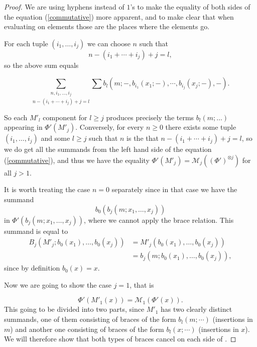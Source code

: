 \documentclass[Thesis.tex]{subfiles}
\begin{document}
\begin{proof}
We are using hyphens instead of $1$'s to make the equality of both sides of the equation (\ref{commutative}) more apparent, and to make clear that when evaluating on elements those are the places where the elements go. %

For each tuple $(i_1,\dots, i_j)$ we can choose $n$ such that \[n-(i_1+\cdots+i_j)+j=l,\] so the above sum equals

\[\underset{n-(i_1+\cdots+i_j)+j=l}{\sum_{n,i_1,\dots, i_j}}\sum b_l(m;-,b_{i_1}(x_1;-),\cdots,b_{i_j}(x_j;-),-).\]

So each $M'_l$ component for $l\geq j$ produces precisely the terms $b_l(m;\dots)$ appearing in $\Phi'(M'_j)$. Conversely, for every $n\geq 0$ there exists some tuple $(i_1,\dots, i_j)$ and some $l\geq j$ such that $n$ is the that $n-(i_1+\cdots+i_j)+j=l$, so we do get all the summands from the left hand side of the equation (\ref{commutative}), and thus we have the equality $\Phi'(M'_j)=\mathcal{M}_j((\Phi')^{\otimes j})$ for all $j>1$.

It is worth treating the case $n=0$ separately since in that case we have the summand \[b_0(b_j(m;x_1,\dots, x_j))\] 
in $\Phi'(b_j(m;x_1,\dots, x_j))$, where we cannot apply the brace relation. This summand is equal to 
\begin{align*}
B_j(M'_j;b_0(x_1),\dots, b_0(x_j))&=M'_j(b_0(x_1),\dots, b_0(x_j))\\
&=b_j(m;b_0(x_1),\dots, b_0(x_j)), 
\end{align*}
since by definition $b_0(x)=x$.%

Now we are going to show the case $j=1$, that is

\begin{equation}\label{case1}
\Phi'(M'_1(x))=\mathcal{M}_1(\Phi'(x)).
\end{equation} This going to be divided into two parts, since $M'_1$ has two clearly distinct summands, one of them consisting of braces of the form $b_l(m;\cdots)$ (insertions in $m$) and another one consisting of braces of the form $b_l(x;\cdots)$ (insertions in $x$). We will therefore show that both types of braces cancel on each side of .


\end{proof}
\end{document}
